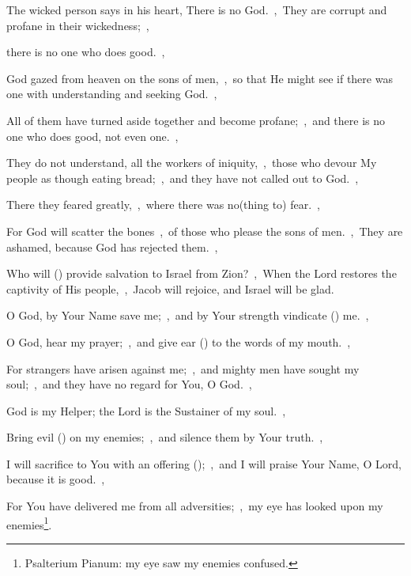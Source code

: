 \documentclass[12pt,twoside,a5paper]{article}
\begin{document}
\begin{normalparskip}
  The wicked person says in his heart, There is no God.~\sep\ They are corrupt and profane in their wickedness;~\sep


  there is no one who does good.~\sep

  God gazed from heaven on the sons of men,~\sep\ so that He might see if there was one with understanding and seeking God.~\sep

  All of them have turned aside together and become profane;~\sep\ and there is no one who does good, not even one.~\sep

  They do not understand, all the workers of iniquity,~\sep\ those who devour My people as though eating bread;~\sep\ and they have not called out to God.~\sep

  There they feared greatly,~\sep\ where there was no(thing to) fear.~\sep

  For God will scatter the bones~\sep\ of those who please the sons of men.~\sep\ They are ashamed, because God has rejected them.~\sep

  Who will () provide salvation to Israel from Zion?~\sep\ When the Lord restores the captivity of His people,~\sep\ Jacob will rejoice, and Israel will be glad.
\end{normalparskip}


\begin{normalparskip}
  O God, by Your Name save me;~\sep\ and by Your strength vindicate () me.~\sep


  O God, hear my prayer;~\sep\ and give ear () to the words of my mouth.~\sep

  For strangers have arisen against me;~\sep\ and mighty men have sought my soul;~\sep\ and they have no regard for You, O God.~\sep

  God is my Helper; the Lord is the Sustainer of my soul.~\sep

  Bring evil () on my enemies;~\sep\ and silence them by Your truth.~\sep

  I will sacrifice to You with an offering ();~\sep\ and I will praise Your Name, O Lord, because it is good.~\sep

  For You have delivered me from all adversities;~\sep\ my eye has looked upon my enemies\footnote{Psalterium Pianum: my eye saw my enemies confused.}.
\end{normalparskip}
\end{document}
